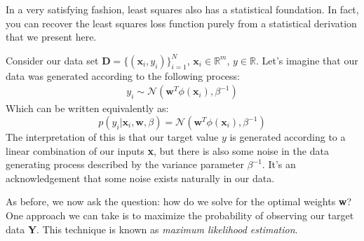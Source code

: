 In a very satisfying fashion, least squares also has a statistical foundation. In fact, you can recover the least squares loss function purely from a statistical derivation that we present here.

Consider our data set $\textbf{D} = \{(\textbf{x}_{i}, y_{i})\}_{i = 1}^{N}$, $\textbf{x}_{i} \in\mathbb{R}^m$, $y \in\mathbb{R}$. Let's imagine that our data was generated according to the following process:
\begin{align*}
    y_{i} \sim \mathcal{N}(\textbf{w}^{T}\phi(\textbf{x}_{i}), \beta^{-1})
\end{align*}
Which can be written equivalently as:
\begin{equation} \label{normal-over-w}
    p(y_{i} | \textbf{x}_{i}, \textbf{w}, \beta) = \mathcal{N}(\textbf{w}^{T}\phi(\textbf{x}_{i}), \beta^{-1})
\end{equation}
The interpretation of this is that our target value $y$ is generated according to a linear combination of our inputs \textbf{x}, but there is also some noise in the data generating process described by the variance parameter $\beta^{-1}$. It's an acknowledgement that some noise exists naturally in our data.


As before, we now ask the question: how do we solve for the optimal weights \textbf{w}? One approach we can take is to maximize the probability of observing our target data \textbf{Y}. This technique is known as \textit{maximum likelihood estimation}.


